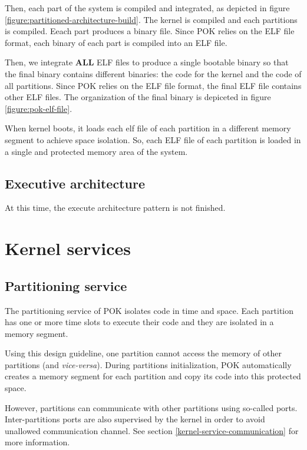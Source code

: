       Then, each part of the system is compiled and integrated, as depicted in
      figure \ref{figure:partitioned-architecture-build}. The kernel is
      compiled and each partitions is compiled. Eeach part produces a binary
      file. Since POK relies on the ELF file format, each binary of each part is
      compiled into an ELF file.


      Then, we integrate \textbf{ALL} ELF files to produce a single bootable binary so
      that the final binary contains different binaries:
      the code for the kernel and the code of all partitions. Since POK relies
      on the ELF file format, the final ELF file contains other ELF files. The
      organization of the final binary is depiceted in figure
      \ref{figure:pok-elf-file}.


      When kernel boots, it loads each elf file of each partition in a different
      memory segment to achieve space isolation. So, each ELF file of each
      partition is loaded in a single and protected memory area of the system.


      \subsection{Executive architecture}
      At this time, the execute architecture pattern is not finished.

\section{Kernel services}
   \subsection{Partitioning service}
   The partitioning service of POK isolates code in time and space. Each
   partition has one or more time slots to execute their code and they are
   isolated in a memory segment.

   Using this design guideline, one partition cannot access the memory of other
   partitions (and \textit{vice-versa}). During partitions initialization, POK
   automatically creates a memory segment for each partition and copy its code
   into this protected space.

   However, partitions can communicate with other partitions using so-called
   ports. Inter-partitions ports are also supervised by the kernel in order to
   avoid unallowed communication channel. See section
   \ref{kernel-service-communication} for more information.

